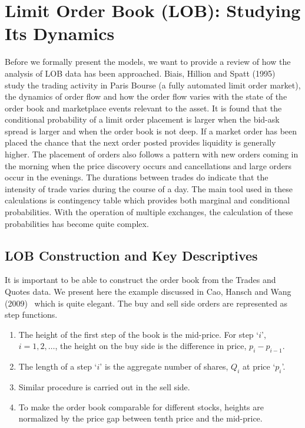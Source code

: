 \section{Limit Order Book (LOB): Studying Its Dynamics}

Before we formally present the models, we want to provide a review of how the analysis of LOB data has been approached. Biais, Hillion and Spatt (1995)~\cite{spalt} study the trading activity in Paris Bourse (a fully automated limit order market), the dynamics of order flow and how the order flow varies with the state of the order book and marketplace events relevant to the asset. It is found that the conditional probability of a limit order placement is larger when the bid-ask spread is larger and when the order book is not deep. If a market order has been placed the chance that the next order posted provides liquidity is generally higher. The placement of orders also follows a pattern with new orders coming in the morning when the price discovery occurs and cancellations and large orders occur in the evenings. The durations between trades do indicate that the intensity of trade varies during the course of a day. The main tool used in these calculations is contingency table which provides both marginal and conditional probabilities. With the operation of multiple exchanges, the calculation of these probabilities has become quite complex. 


\subsection{LOB Construction and Key Descriptives}

It is important to be able to construct the order book from the Trades and Quotes data. We present here the example discussed in Cao, Hansch and Wang (2009)~\cite{caohanschwang} which is quite elegant. The buy and sell side orders are represented as step functions. 
        \begin{enumerate}[--]
        \item The height of the first step of the book is the mid-price. For step `$i$', $i=1,2,\ldots$, the height on the buy side is the difference in price, $p_i - p_{i-1}$. 
        \item The length of a step `$i$' is the aggregate number of shares, $Q_i$ at price `$p_i$'.
        \item Similar procedure is carried out in the sell side.
        \item To make the order book comparable for different stocks, heights are normalized by the price gap between tenth price and the mid-price. 
        \end{enumerate}


